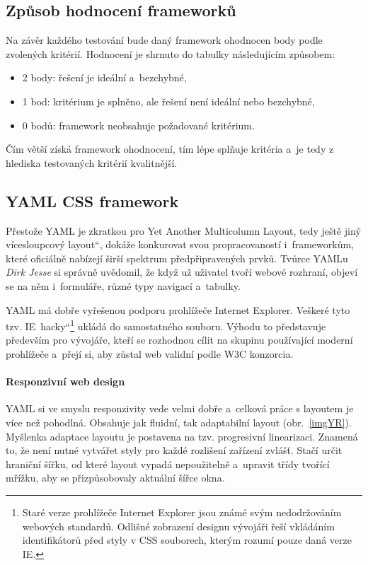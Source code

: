 \documentclass[thesis=B,czech]{FITthesis}[2012/06/26]
\begin{document}
\subsection{Způsob hodnocení frameworků}

Na závěr každého testování bude daný framework ohodnocen body podle zvolených kritérií. Hodnocení je shrnuto do tabulky následujícím způsobem:

\begin{itemize}
 \item 2 body: řešení je ideální a~bezchybné,
 \item 1 bod: kritérium je splněno, ale řešení není ideální nebo bezchybné,
 \item 0 bodů: framework neobsahuje požadované kritérium.
\end{itemize}
Čím větší získá framework ohodnocení, tím lépe splňuje kritéria a~je tedy z hlediska testovaných kritérií kvalitnější.


\subsection{YAML CSS framework}

Přestože YAML je zkratkou pro Yet Another Multicolumn Layout, tedy \quotedblbase ještě jiný vícesloupcový layout\textquotedblleft , dokáže konkurovat svou propracovaností i~frameworkům, které oficiálně nabízejí širší spektrum předpřipravených prvků. Tvůrce YAMLu \textit{Dirk Jesse} si správně uvědomil, že když už uživatel tvoří webové rozhraní, objeví se na něm i~formuláře, různé typy navigací a~tabulky. 

YAML má dobře vyřešenou podporu prohlížeče Internet Explorer. Veškeré tyto tzv. \quotedblbase IE~hacky\textquotedblleft\footnote{Staré verze prohlížeče Internet Explorer jsou známé svým nedodržováním webových standardů. Odlišné zobrazení designu vývojáři řeší vkládáním identifikátorů před styly v CSS souborech, kterým rozumí pouze daná verze IE.} ukládá do samostatného souboru. Výhodu to představuje především pro vývojáře, kteří se rozhodnou cílit na skupinu používající moderní prohlížeče a~přejí si, aby zůstal web validní podle W3C konzorcia. 

\paragraph{Responzivní web design}

YAML si ve smyslu responzivity vede velmi dobře a~celková práce s layoutem je více než pohodlná. Obsahuje jak fluidní, tak adaptabilní layout (obr.~\ref{imgYR}). Myšlenka adaptace layoutu je postavena na tzv. progresivní linearizaci. Znamená to, že není nutné vytvářet styly pro každé rozlišení zařízení zvlášť. Stačí určit hraniční šířku, od které layout vypadá nepoužitelně a~upravit třídy tvořící mřížku, aby se přizpůsobovaly aktuální šířce okna.
\end{document}
